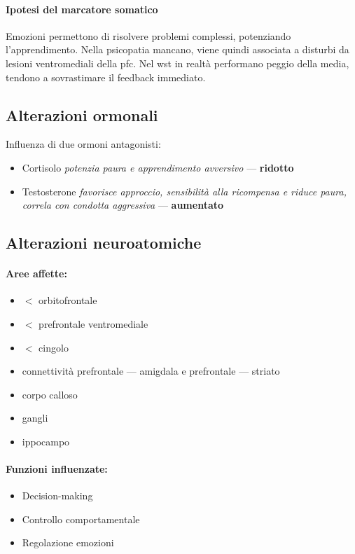 \documentclass[12pt, a4paper]{article}
\begin{document}
\paragraph{Ipotesi del marcatore somatico}  

Emozioni permettono di risolvere problemi complessi, potenziando l'apprendimento.
Nella psicopatia mancano, viene quindi associata a disturbi da lesioni ventromediali della pfc. Nel wst in realtà performano peggio della media, tendono a sovrastimare il feedback immediato.

\subsection{Alterazioni ormonali} 

Influenza di due ormoni antagonisti:
\begin{itemize}
    \item Cortisolo \emph{potenzia paura e apprendimento avversivo} --- \textbf{ridotto}
    \item Testosterone \emph{favorisce approccio, sensibilità alla ricompensa e riduce paura, correla con condotta aggressiva} --- \textbf{aumentato} 
\end{itemize}

\subsection{Alterazioni neuroatomiche} 

\paragraph{Aree affette:}
\begin{itemize}
    \item $<$ orbitofrontale
    \item $<$ prefrontale ventromediale
    \item $<$ cingolo
    \item connettività prefrontale --- amigdala e prefrontale --- striato
    \item corpo calloso
    \item gangli
    \item ippocampo
\end{itemize}

\paragraph{Funzioni influenzate:}
\begin{itemize}
    \item Decision-making 
    \item Controllo comportamentale
    \item Regolazione emozioni
\end{itemize}
\end{document}
